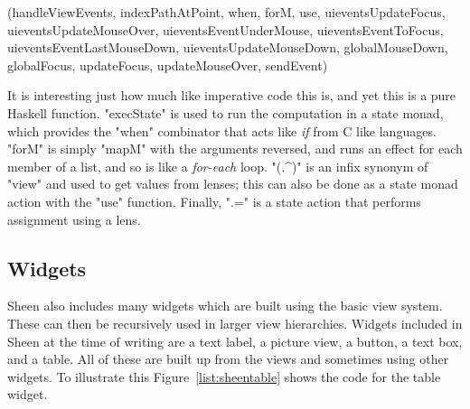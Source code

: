 \functions(handleViewEvents, indexPathAtPoint, when, forM, use, uieventsUpdateFocus, uieventsUpdateMouseOver, uieventsEventUnderMouse, uieventsEventToFocus, uieventsEventLastMouseDown, uieventsUpdateMouseDown, globalMouseDown, globalFocus, updateFocus, updateMouseOver, sendEvent)
\noindent 
It is interesting just how much like imperative code this is, and yet this is a pure Haskell function. "execState" is used to run the computation in a state monad, which provides the "when" combinator that acts like \emph{if} from C like languages. "forM" is simply "mapM" with the arguments reversed, and runs an effect for each member of a list, and so is like a \emph{for-each} loop. "(.^)" is an infix synonym of "view" and used to get values from lenses; this can also be done as a state monad action with the "use" function. Finally, ".=" is a state action that performs assignment using a lens.

\subsection{Widgets}

Sheen also includes many widgets which are built using the basic view system. These can then be recursively used in larger view hierarchies. Widgets included in Sheen at the time of writing are a text label, a picture view, a button, a text box, and a table. All of these are built up from the views and sometimes using other widgets. To illustrate this Figure~\ref{list:sheentable} shows the code for the table widget.

